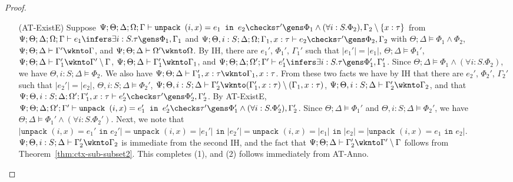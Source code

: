 \begin{proof}
\begin{itemize}
   \item[(AT-ExistE)]
   Suppose $\Psi ; \Theta ; \Delta ; \Omega ; \Gamma\vdash \texttt{unpack } (i,x) = e_1 \texttt{ in } e_2 \checks \tau' \gens \Phi_1 \wedge (\forall i : S. \Phi_2) , \Gamma_2 \setminus \{x : \tau\}$
   from 
   $\Psi ; \Theta ; \Delta ; \Omega ; \Gamma\vdash e_1 \infers \exists i : S.\tau \gens \Phi_1, \Gamma_1$
   and 
   $\Psi ; \Theta, i : S ; \Delta ; \Omega ; \Gamma_1, x : \tau \vdash e_2 \checks \tau' \gens \Phi_2, \Gamma_2$
   with $\Theta ; \Delta \vDash \Phi_1 \wedge \Phi_2$,
   $\Psi ; \Theta ; \Delta \vdash \Gamma' \wknto \Gamma$, and
   $\Psi ; \Theta ; \Delta \vdash \Omega' \wknto \Omega$.
   By IH, there are $e_1'$, $\Phi_1'$, $\Gamma_1'$ such that 
   $|e_1'| = |e_1|$,
   $\Theta ; \Delta \vDash \Phi_1'$,
   $\Psi ; \Theta ; \Delta \vdash \Gamma_1' \wknto \Gamma' \setminus \Gamma$,
   $\Psi ; \Theta ; \Delta \vdash \Gamma_1' \wknto \Gamma_1$, and
   $\Psi ; \Theta ; \Delta ; \Omega' ; \Gamma'\vdash e_1' \infers \exists i : S.\tau \gens \Phi_1', \Gamma_1'$.
   Since $\Theta ; \Delta \vDash \Phi_1 \wedge (\forall i : S. \Phi_2)$, we have $\Theta, i : S ; \Delta \vDash \Phi_2$. We also have $\Psi ; \Theta ; \Delta \vdash \Gamma_1', x : \tau \wknto \Gamma_1, x : \tau$. From these two facts we have
   by IH that there are $e_2'$, $\Phi_2'$, $\Gamma_2'$ such that
   $|e_2'| = |e_2|$,
   $\Theta, i : S ; \Delta \vDash \Phi_2'$,
   $\Psi ; \Theta, i : S ; \Delta \vdash \Gamma_2' \wknto (\Gamma_1', x : \tau) \setminus (\Gamma_1, x : \tau)$,
   $\Psi ; \Theta, i : S ; \Delta \vdash \Gamma_2' \wknto \Gamma_2$, and that
   $\Psi ; \Theta, i : S ; \Delta ; \Omega' ; \Gamma_1', x : \tau \vdash e_2' \checks \tau' \gens \Phi_2',\Gamma_2'$.
   By AT-ExistE, 
   $\Psi ; \Theta ; \Delta ; \Omega' ; \Gamma' \vdash \texttt{unpack } (i,x) = e_1' \texttt{ in } e_2' \checks \tau' \gens \Phi_1' \wedge (\forall i : S. \Phi_2'), \Gamma_2'$.
   Since $\Theta ; \Delta \vDash \Phi_1'$ and $\Theta, i : S; \Delta \vDash \Phi_2'$, we have $\Theta ; \Delta \vDash \Phi_1' \wedge (\forall i : S. \Phi_2')$.
   Next, we note that $|\texttt{unpack } (i,x) = e_1' \texttt{ in } e_2'| = \texttt{unpack } (i,x) = |e_1'| \texttt{ in } |e_2'| = \texttt{unpack } (i,x) = |e_1| \texttt{ in } |e_2| = |\texttt{unpack } (i,x) = e_1 \texttt{ in } e_2|$. $\Psi ; \Theta, i : S ; \Delta \vdash \Gamma_2' \wknto \Gamma_2$ is immediate from the second IH, and the fact that $\Psi ; \Theta ; \Delta \vdash \Gamma_2' \wknto \Gamma' \setminus \Gamma$ follows from Theorem~\ref{thm:ctx-sub-subset2}. This completes (1), and (2) follows immediately from AT-Anno.
   

\end{itemize}
\end{proof}
